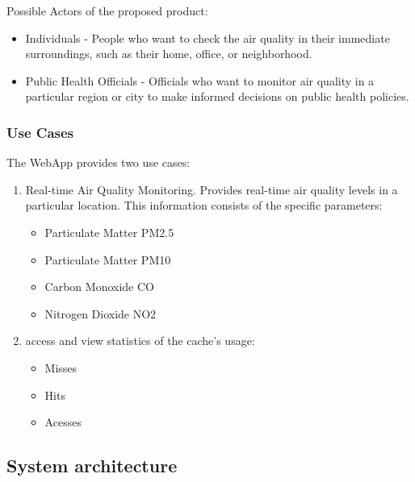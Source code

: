 \documentclass[12pt]{article}
\begin{document}
Possible Actors of the proposed product:

\begin{itemize}

\item Individuals - People who want to check the air quality in their immediate surroundings, such as their home, office, or neighborhood.

\item Public Health Officials - Officials who want to monitor air quality in a particular region or city to make informed decisions on public health policies.

\end{itemize}


\subsubsection{Use Cases}
The WebApp provides two use cases:

\begin{enumerate}

\item  Real-time Air Quality Monitoring. Provides real-time air quality levels in a particular location. This information consists of the specific parameters: 
	\begin{itemize}
		\item Particulate Matter PM2.5
		\item Particulate Matter PM10
		\item Carbon Monoxide CO
		\item Nitrogen Dioxide NO2
	\end{itemize}
	
\item access and view statistics of the cache's usage:
	\begin{itemize}
		\item Misses
		\item Hits
		\item Acesses
	\end{itemize}

\end{enumerate}


\subsection{System architecture}
\end{document}
